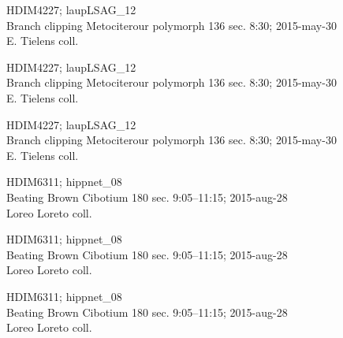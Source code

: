 \documentclass[2pt]{extarticle}
\begin{document}
\noindent
\parbox{0.16\textwidth}{\tiny \raggedright \rule[-0.3\baselineskip]{0pt}{10pt}HDIM4227; laupLSAG\_12\\ Branch clipping Metociterour polymorph 136 sec. 8:30; 2015-may-30\\ E. Tielens coll.}
\parbox{0.16\textwidth}{\tiny \raggedright \rule[-0.3\baselineskip]{0pt}{10pt}HDIM4227; laupLSAG\_12\\ Branch clipping Metociterour polymorph 136 sec. 8:30; 2015-may-30\\ E. Tielens coll.}
\parbox{0.16\textwidth}{\tiny \raggedright \rule[-0.3\baselineskip]{0pt}{10pt}HDIM4227; laupLSAG\_12\\ Branch clipping Metociterour polymorph 136 sec. 8:30; 2015-may-30\\ E. Tielens coll.}
\parbox{0.16\textwidth}{\tiny \raggedright \rule[-0.3\baselineskip]{0pt}{10pt}HDIM6311; hippnet\_08\\ Beating Brown Cibotium 180 sec. 9:05--11:15; 2015-aug-28\\ Loreo Loreto coll.}
\parbox{0.16\textwidth}{\tiny \raggedright \rule[-0.3\baselineskip]{0pt}{10pt}HDIM6311; hippnet\_08\\ Beating Brown Cibotium 180 sec. 9:05--11:15; 2015-aug-28\\ Loreo Loreto coll.}
\parbox{0.16\textwidth}{\tiny \raggedright \rule[-0.3\baselineskip]{0pt}{10pt}HDIM6311; hippnet\_08\\ Beating Brown Cibotium 180 sec. 9:05--11:15; 2015-aug-28\\ Loreo Loreto coll.} \\ 
\vspace{0.001in} 
\end{document}
